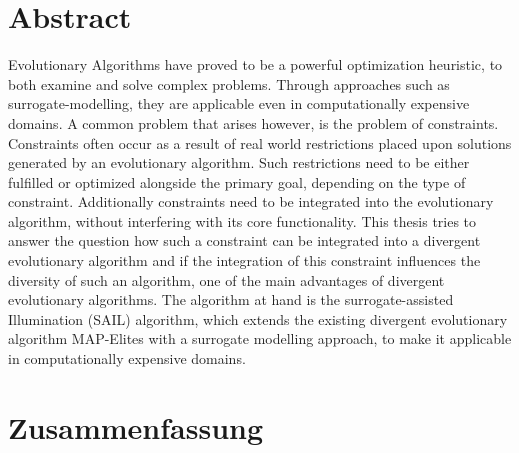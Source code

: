 
\clearpage
\section*{Abstract}
Evolutionary Algorithms have proved to be a powerful optimization heuristic, to both examine and solve complex problems.
Through approaches such as surrogate-modelling, they are applicable even in computationally expensive domains.
A common problem that arises however, is the problem of constraints.
Constraints often occur as a result of real world restrictions placed upon solutions generated by an evolutionary algorithm.
Such restrictions need to be either fulfilled or optimized alongside the primary goal, depending on the type of constraint.
Additionally constraints need to be integrated into the evolutionary algorithm, without interfering with its core functionality.
This thesis tries to answer the question how such a constraint can be integrated into a divergent evolutionary algorithm and if the integration of this constraint influences the diversity of such an algorithm, one of the main advantages of divergent evolutionary algorithms.
The algorithm at hand is the surrogate-assisted Illumination (SAIL) algorithm, which extends the existing divergent evolutionary algorithm MAP-Elites with a surrogate modelling approach, to make it applicable in computationally expensive domains.

\clearpage
\section*{Zusammenfassung}


